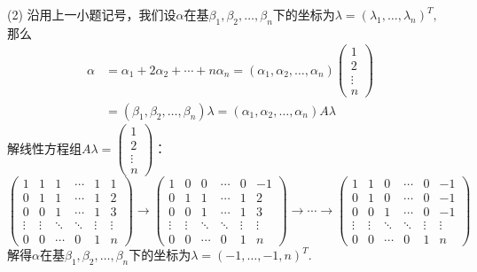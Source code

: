 (2) 沿用上一小题记号，我们设$\alpha$在基$\beta_1, \beta_2, \ldots, \beta_n$下的坐标为$\lambda = (\lambda_1, \ldots, \lambda_n)^T,$ 那么
\begin{align*}
\alpha & = \alpha_1 + 2 \alpha_2 + \cdots + n \alpha_n = (\alpha_1, \alpha_2, \ldots, \alpha_n) \begin{pmatrix} 1 \\ 2 \\ \vdots \\ n \end{pmatrix} \\
& = (\beta_1, \beta_2, \ldots, \beta_n) \lambda = (\alpha_1, \alpha_2, \ldots, \alpha_n) A \lambda
\end{align*}
解线性方程组$A \lambda = \begin{pmatrix} 1 \\ 2 \\ \vdots \\ n \end{pmatrix}$：
$$\left( \begin{array}{ccccc|c}1 & 1 & 1 & \cdots & 1 & 1 \\ 0 & 1 & 1 & \cdots & 1 & 2 \\ 0 & 0 & 1 & \cdots & 1 & 3 \\ \vdots & \vdots & \ddots & \ddots & \vdots & \vdots \\ 0 & 0 & \cdots & 0 & 1 & n \end{array} \right) \rightarrow \left( \begin{array}{ccccc|c}1 & 0 & 0 & \cdots & 0 & -1 \\ 0 & 1 & 1 & \cdots & 1 & 2 \\ 0 & 0 & 1 & \cdots & 1 & 3 \\ \vdots & \vdots & \ddots & \ddots & \vdots & \vdots \\ 0 & 0 & \cdots & 0 & 1 & n \end{array} \right) \rightarrow \cdots \rightarrow \left( \begin{array}{ccccc|c}1 & 1 & 0 & \cdots & 0 & -1 \\ 0 & 1 & 0 & \cdots & 0 & -1 \\ 0 & 0 & 1 & \cdots & 0 & -1 \\ \vdots & \vdots & \ddots & \ddots & \vdots & \vdots \\ 0 & 0 & \cdots & 0 & 1 & n \end{array} \right)$$
解得$\alpha$在基$\beta_1, \beta_2, \ldots, \beta_n$下的坐标为$\lambda = (-1, \ldots, -1, n)^T.$

\fi  %

